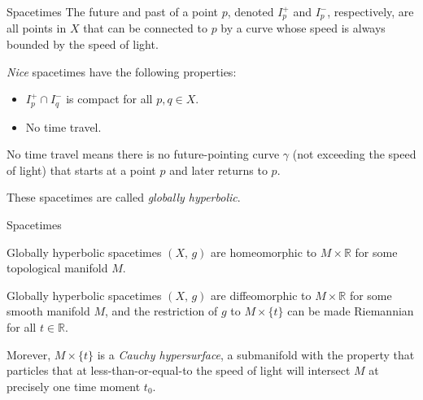 \documentclass{beamer}
\begin{document}
    \begin{frame}{Spacetimes}
        The future and past of a point $p$, denoted $I_{p}^{+}$ and $I_{p}^{-}$,
        respectively, are all points in $X$ that can be connected to $p$ by a
        curve whose speed is always bounded by the speed of light.
        \par\hfill\par
        \textit{Nice} spacetimes have the following properties:
        \begin{itemize}
            \item
                $I_{p}^{+}\cap{I}_{q}^{-}$ is compact for all $p,q\in{X}$.
            \item
                No time travel.
        \end{itemize}
        No time travel means there is no future-pointing curve $\gamma$ (not
        exceeding the speed of light) that starts at a point $p$ and later
        returns to $p$.
        \par\hfill\par
        These spacetimes are called \textit{globally hyperbolic}.
    \end{frame}
    \begin{frame}{Spacetimes}
        \begin{theorem}[Geroch, 1970]
            Globally hyperbolic spacetimes $(X,\,g)$ are homeomorphic to
            $M\times\mathbb{R}$ for some topological manifold $M$.
        \end{theorem}
        \begin{theorem}
            Globally hyperbolic spacetimes $(X,\,g)$ are diffeomorphic to
            $M\times\mathbb{R}$ for some smooth manifold $M$, and the
            restriction of $g$ to $M\times\{t\}$ can be made Riemannian for all
            $t\in\mathbb{R}$.
        \end{theorem}
        Morever, $M\times\{t\}$ is a \textit{Cauchy hypersurface}, a submanifold
        with the property that particles that at less-than-or-equal-to the
        speed of light will intersect $M$ at precisely one time moment $t_{0}$.
    \end{frame}
\end{document}

